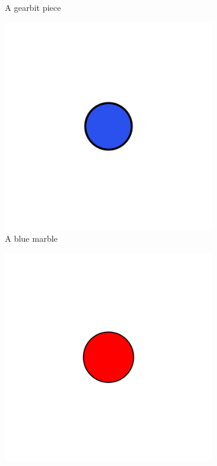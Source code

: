 \documentclass{l4proj}
\begin{document}
\begin{figure}
\begin{subfigure}[b]{0.3\textwidth}
        \caption{A gearbit piece}
        \label{fig:gearbit}
    \end{subfigure}
    \begin{subfigure}[b]{0.3\textwidth}
        \includegraphics[width=1\textwidth]{images/blue-marble.png}
        \caption{A blue marble}
        \label{fig:blueMarble}
    \end{subfigure}
    \begin{subfigure}[b]{0.3\textwidth}
        \includegraphics[width=1\textwidth]{images/red-marble.png}

\end{subfigure}
\end{figure}
\end{document}
